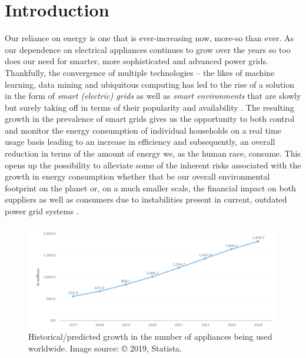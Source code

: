 \chapter{Introduction}
\label{ch:Introduction}
Our reliance on energy is one that is ever-increasing now, more-so than ever. As our dependence on electrical appliances continues to grow over the years \cite{Statista, WBCSD, Yixuan} so too does our need for smarter, more sophisticated and advanced power grids. Thankfully, the convergence of multiple technologies -- the likes of machine learning, data mining and ubiquitous computing has led to the rise of a solution in the form of \textit{smart (electric) grids} as well as \textit{smart environments} that are slowly but surely taking off in terms of their popularity and availability \cite{Chao}. The resulting growth in the prevalence of smart grids gives us the opportunity to both control and monitor the energy consumption of individual households on a real time usage basis \cite{Yildiz} leading to an increase in efficiency and subsequently, an overall reduction in terms of the amount of energy we, as the human race, consume. This opens up the possibility to alleviate some of the inherent risks associated with the growth in energy consumption whether that be our overall environmental footprint on the planet or, on a much smaller scale, the financial impact on both suppliers as well as consumers due to instabilities present in current, outdated power grid systems \cite{Hsiao}.

\begin{figure}[hbt!]
    \centering
    \includegraphics[width=\textwidth]{Images/Chapter 1/Statista/Appliance-Usage-Growth.PNG}
    \caption{Historical/predicted growth in the number of appliances being used worldwide. Image source: \cite{Statista} © 2019, Statista.}
    \label{fig:Appliance-Usage-Growth}
\end{figure}

